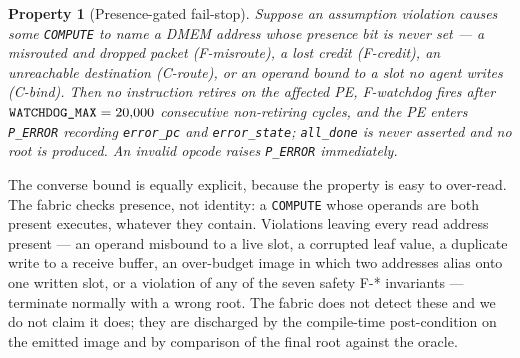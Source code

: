 \documentclass[journal,10pt]{IEEEtran}
\theoremstyle{plain}
\newtheorem{property}{Property}
\theoremstyle{definition}
\theoremstyle{remark}
\newcommand{\sv}[1]{\texttt{#1}}
\begin{document}
\begin{property}[Presence-gated fail-stop]\label{prop:2}
Suppose an assumption violation causes some \texttt{COMPUTE} to name a DMEM
address whose presence bit is never set --- a misrouted and dropped packet
(\textsf{F-misroute}), a lost credit (\textsf{F-credit}), an unreachable
destination (\textsf{C-route}), or an operand bound to a slot no agent writes
(\textsf{C-bind}). Then no instruction retires on the affected PE,
\textsf{F-watchdog} fires after $\sv{WATCHDOG\_MAX} = \WatchdogMax$
consecutive non-retiring cycles, and the PE enters \texttt{P\_ERROR} recording
\sv{error\_pc} and \sv{error\_state}; \sv{all\_done} is never asserted and no
root is produced. An invalid opcode raises \texttt{P\_ERROR} immediately.
\end{property}

The converse bound is equally explicit, because the property is easy to
over-read. The fabric checks presence, not identity: a \texttt{COMPUTE} whose
operands are both present executes, whatever they contain. Violations leaving
every read address present --- an operand misbound to a live slot, a corrupted
leaf value, a duplicate write to a receive buffer, an over-budget image in
which two addresses alias onto one written slot, or a violation of any of the
seven safety \textsf{F-*} invariants --- terminate normally with a wrong root.
The fabric does not detect these and we do not claim it does; they are
discharged by the compile-time post-condition on the emitted image and by
comparison of the final root against the oracle.
\end{document}
